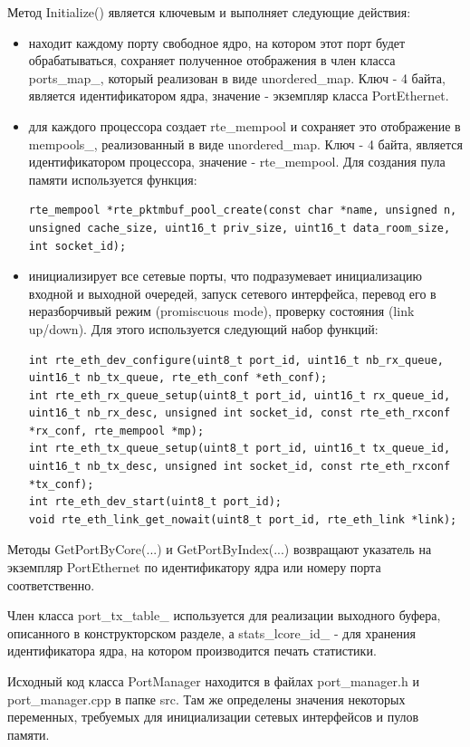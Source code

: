 Метод Initialize() является ключевым и выполняет следующие действия:
\begin{itemize}
\item находит каждому порту свободное ядро, на котором этот порт будет обрабатываться, сохраняет полученное отображения в член класса ports\_map\_, который реализован в виде unordered\_map. Ключ - 4 байта, является идентификатором ядра, значение - экземпляр класса PortEthernet.
\item для каждого процессора создает rte\_mempool и сохраняет это отображение в mempools\_, реализованный в виде unordered\_map. Ключ - 4 байта, является идентификатором процессора, значение - rte\_mempool. Для создания пула памяти используется функция:
\begin{lstlisting}
rte_mempool *rte_pktmbuf_pool_create(const char *name, unsigned n, unsigned cache_size, uint16_t priv_size, uint16_t data_room_size, int socket_id);
\end{lstlisting}
\item инициализирует все сетевые порты, что подразумевает инициализацию входной и выходной очередей, запуск сетевого интерфейса, перевод его в неразборчивый режим (promiscuous mode), проверку состояния (link up/down). Для этого используется следующий набор функций:
\begin{lstlisting}
int rte_eth_dev_configure(uint8_t port_id, uint16_t nb_rx_queue, uint16_t nb_tx_queue, rte_eth_conf *eth_conf);
int rte_eth_rx_queue_setup(uint8_t port_id, uint16_t rx_queue_id, uint16_t nb_rx_desc, unsigned int socket_id, const rte_eth_rxconf *rx_conf, rte_mempool *mp);
int rte_eth_tx_queue_setup(uint8_t port_id, uint16_t tx_queue_id, uint16_t nb_tx_desc, unsigned int socket_id, const rte_eth_rxconf *tx_conf);
int rte_eth_dev_start(uint8_t port_id);
void rte_eth_link_get_nowait(uint8_t port_id, rte_eth_link *link);
\end{lstlisting}
\end{itemize}

Методы GetPortByCore(...) и GetPortByIndex(...) возвращают указатель на экземпляр PortEthernet по идентификатору ядра или номеру порта соответственно.

Член класса port\_tx\_table\_ используется для реализации выходного буфера, описанного в конструкторском разделе, а stats\_lcore\_id\_ - для хранения идентификатора ядра, на котором производится печать статистики.

Исходный код класса PortManager находится в файлах port\_manager.h и port\_manager.cpp в папке src. Там же определены значения некоторых переменных, требуемых для инициализации сетевых интерфейсов и пулов памяти.

